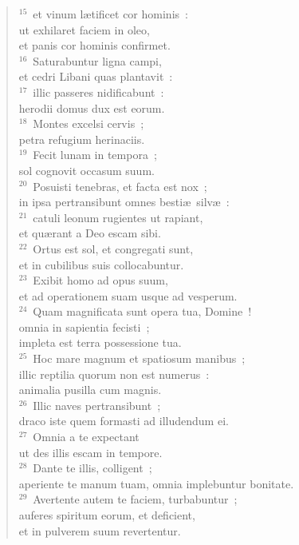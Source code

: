 \begin{verse}
${}^{15}$~et vinum l\ae tificet cor hominis~:\\ ut exhilaret faciem in oleo,\\ et panis cor hominis confirmet.\\
${}^{16}$~Saturabuntur ligna campi,\\ et cedri Libani quas plantavit~:\\
${}^{17}$~illic passeres nidificabunt~:\\ herodii domus dux est eorum.\\
${}^{18}$~Montes excelsi cervis~;\\ petra refugium herinaciis.\\
${}^{19}$~Fecit lunam in tempora~;\\ sol cognovit occasum suum.\\
${}^{20}$~Posuisti tenebras, et facta est nox~;\\ in ipsa pertransibunt omnes besti\ae\ silv\ae~:\\
${}^{21}$~catuli leonum rugientes ut rapiant,\\ et qu\ae rant a Deo escam sibi.\\
${}^{22}$~Ortus est sol, et congregati sunt,\\ et in cubilibus suis collocabuntur.\\
${}^{23}$~Exibit homo ad opus suum,\\ et ad operationem suam usque ad vesperum.\\
${}^{24}$~Quam magnificata sunt opera tua, Domine~!\\ omnia in sapientia fecisti~;\\ impleta est terra possessione tua.\\
${}^{25}$~Hoc mare magnum et spatiosum manibus~;\\ illic reptilia quorum non est numerus~:\\ animalia pusilla cum magnis.\\
${}^{26}$~Illic naves pertransibunt~;\\ draco iste quem formasti ad illudendum ei.\\
${}^{27}$~Omnia a te expectant\\ ut des illis escam in tempore.\\
${}^{28}$~Dante te illis, colligent~;\\ aperiente te manum tuam, omnia implebuntur bonitate.\\
${}^{29}$~Avertente autem te faciem, turbabuntur~;\\ auferes spiritum eorum, et deficient,\\ et in pulverem suum revertentur.\\

\end{verse}
